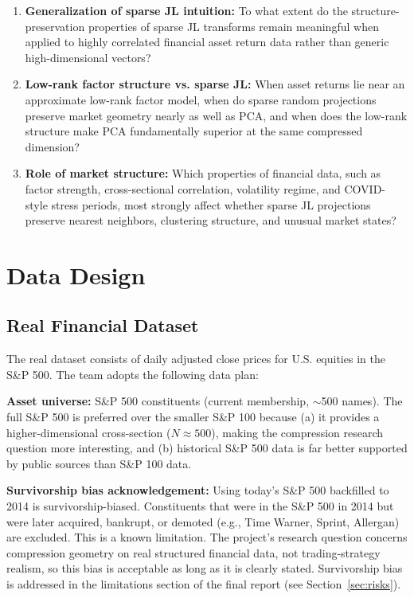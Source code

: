 \documentclass[11pt]{article}
\begin{document}
\begin{enumerate}
    \item \textbf{Generalization of sparse JL intuition:} To what extent do the structure-preservation properties of sparse JL transforms remain meaningful when applied to highly correlated financial asset return data rather than generic high-dimensional vectors?

    \item \textbf{Low-rank factor structure vs. sparse JL:} When asset returns lie near an approximate low-rank factor model, when do sparse random projections preserve market geometry nearly as well as PCA, and when does the low-rank structure make PCA fundamentally superior at the same compressed dimension?

    \item \textbf{Role of market structure:} Which properties of financial data, such as factor strength, cross-sectional correlation, volatility regime, and COVID-style stress periods, most strongly affect whether sparse JL projections preserve nearest neighbors, clustering structure, and unusual market states?
\end{enumerate}

\section{Data Design}

\subsection{Real Financial Dataset}

The real dataset consists of daily adjusted close prices for U.S. equities in the S\&P 500. The team adopts the following data plan:

\textbf{Asset universe:} S\&P 500 constituents (current membership, $\sim$500 names). The full S\&P 500 is preferred over the smaller S\&P 100 because (a) it provides a higher-dimensional cross-section ($N \approx 500$), making the compression research question more interesting, and (b) historical S\&P 500 data is far better supported by public sources than S\&P 100 data.

\textbf{Survivorship bias acknowledgement:} Using today's S\&P 500 backfilled to 2014 is survivorship-biased. Constituents that were in the S\&P 500 in 2014 but were later acquired, bankrupt, or demoted (e.g., Time Warner, Sprint, Allergan) are excluded. This is a known limitation. The project's research question concerns compression geometry on real structured financial data, not trading-strategy realism, so this bias is acceptable as long as it is clearly stated. Survivorship bias is addressed in the limitations section of the final report (see Section~\ref{sec:risks}).
\end{document}
